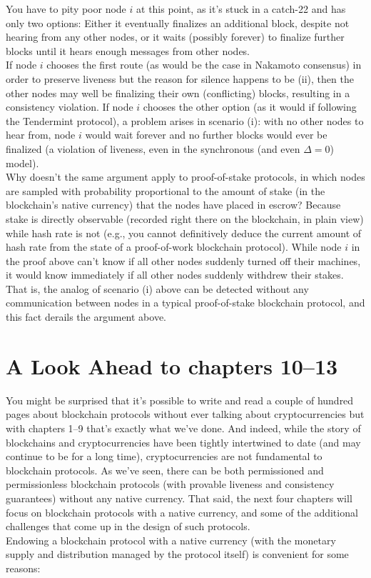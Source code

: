 You have to pity poor node $i$ at this point, as it’s stuck in a catch-22 and has only two options:
Either it eventually finalizes an additional block, despite not hearing from any other nodes,
or it waits (possibly forever) to finalize further blocks until it hears enough messages from
other nodes.\\

If node $i$ chooses the first route (as would be the case in Nakamoto consensus) in order
to preserve liveness but the reason for silence happens to be (ii), then the other nodes
may well be finalizing their own (conflicting) blocks, resulting in a consistency violation. If
node $i$ chooses the other option (as it would if following the Tendermint protocol), a problem
arises in scenario (i): with no other nodes to hear from, node $i$ would wait forever and no
further blocks would ever be finalized (a violation of liveness, even in the synchronous (and
even $\Delta = 0$) model).\\

Why doesn't the same argument apply to proof-of-stake protocols, in which nodes are
sampled with probability proportional to the amount of stake (in the blockchain’s native currency) that the nodes have placed in escrow? Because stake is directly observable (recorded right there on the blockchain, in plain view) while hash rate is not (e.g., you cannot definitively deduce the current amount of hash rate from the state of a proof-of-work blockchain protocol). While node $i$ in the proof above can’t know if all other nodes suddenly turned
off their machines, it would know immediately if all other nodes suddenly withdrew their
stakes. That is, the analog of scenario (i) above can be detected without any communication between nodes in a typical proof-of-stake blockchain protocol, and this fact derails the argument above.

\section{A Look Ahead to chapters 10–13}
You might be surprised that it’s possible to write and read a couple of hundred pages about
blockchain protocols without ever talking about cryptocurrencies but with chapters 1–9
that’s exactly what we've done. And indeed, while the story of blockchains and cryptocurrencies have been tightly intertwined to date (and may continue to be for a long time),
cryptocurrencies are not fundamental to blockchain protocols. As we've seen, there can
be both permissioned and permissionless blockchain protocols (with provable liveness and
consistency guarantees) without any native currency. That said, the next four chapters will
focus on blockchain protocols with a native currency, and some of the additional challenges
that come up in the design of such protocols.\\
Endowing a blockchain protocol with a native currency (with the monetary supply and
distribution managed by the protocol itself) is convenient for some reasons:\\

